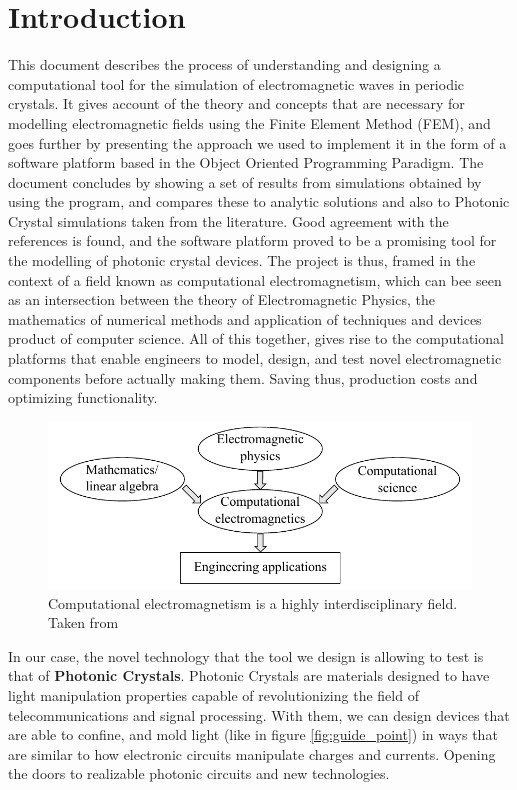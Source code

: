 \cleardoublepage {}
{}
\chapter*{Introduction}

This document describes the process of understanding and designing a computational tool for the simulation of electromagnetic waves in periodic crystals. It gives account of the  theory and concepts that are necessary for modelling electromagnetic fields using the Finite Element Method (FEM), and goes further by presenting the approach we used to implement it in the form of a software platform based in the Object Oriented Programming Paradigm. The document concludes by showing a set of results from simulations obtained by using the program, and compares these to analytic solutions and also to Photonic Crystal simulations taken from the literature. Good agreement with the references is found, and the software platform proved to be a promising tool for the modelling of photonic crystal devices.
The project is thus, framed in the context of a field known as computational electromagnetism, which can bee seen as an intersection between the theory of Electromagnetic Physics, the mathematics of numerical methods and application of techniques and devices product of computer science. All of this together, gives rise to the computational platforms that enable engineers to model, design, and test novel electromagnetic components before actually making them. Saving thus, production costs and optimizing functionality.  
\begin{figure}
\centering
\includegraphics[scale=1]{./img/interdisciplinary.pdf}
\caption{Computational electromagnetism is a highly interdisciplinary field. Taken from \cite{Jin2010}}
\label{fig:computational}
\end{figure}
In our case, the novel technology that the tool we design is allowing to test is that of \textbf{Photonic Crystals}. Photonic Crystals are materials designed to have light manipulation properties capable of revolutionizing the field of telecommunications and signal processing. With them, we can design devices that are able to confine, and mold light (like in figure \ref{fig:guide_point}) in ways that are similar to how electronic circuits manipulate charges and currents.  Opening the doors to realizable photonic circuits and new technologies.

